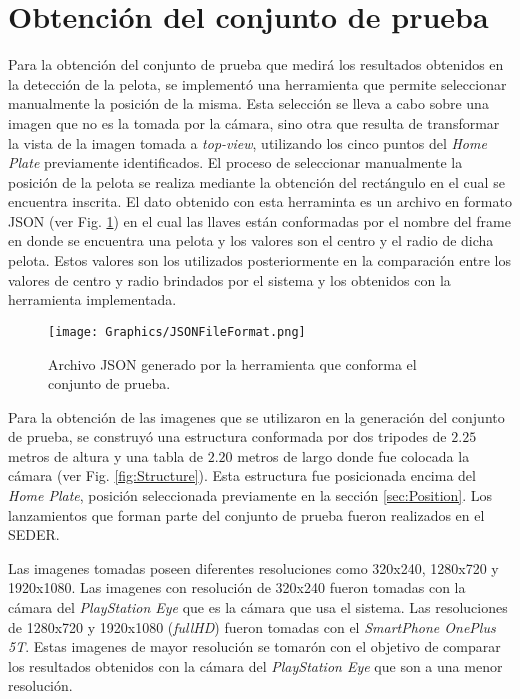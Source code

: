 \section{Obtención del conjunto de prueba}

Para la obtención del conjunto de prueba que medirá los resultados obtenidos en la detección de la pelota, se implementó una herramienta que permite seleccionar manualmente la posición de la misma. Esta selección se lleva a cabo sobre una imagen que no es la tomada por la cámara, sino otra que resulta de transformar la vista de la imagen tomada a \textit{top-view}, utilizando los cinco puntos del \textit{Home Plate} previamente identificados. El proceso de seleccionar manualmente la posición de la pelota se realiza mediante la obtención del rectángulo en el cual se encuentra inscrita. El dato obtenido con esta herraminta es un archivo en formato JSON (ver Fig. \ref{fig:JsonFile}) en el cual las llaves están conformadas por el nombre del frame en donde se encuentra una pelota y los valores son el centro y el radio de dicha pelota. Estos valores son los utilizados posteriormente en la comparación entre los valores de centro y radio brindados por el sistema y los obtenidos con la herramienta implementada.

\begin{figure}[!h]
    \centering
	\texttt{[image: Graphics/JSONFileFormat.png]}
    \caption{Archivo JSON generado por la herramienta que conforma el conjunto de prueba.}
    \label{fig:JsonFile}
\end{figure}

Para la obtención de las imagenes que se utilizaron en la generación del conjunto de prueba, se construyó una estructura conformada por dos tripodes de $2.25$ metros de altura y una tabla de $2.20$ metros de largo donde fue colocada la cámara (ver Fig. \ref{fig:Structure}). Esta estructura fue posicionada encima del \textit{Home Plate}, posición seleccionada previamente en la sección \ref{sec:Position}. Los lanzamientos que forman parte del conjunto de prueba fueron realizados en el SEDER.

Las imagenes tomadas poseen diferentes resoluciones como 320x240, 1280x720 y 1920x1080. Las imagenes con resolución de 320x240 fueron tomadas con la cámara del \textit{PlayStation Eye} que es la cámara que usa el sistema. Las resoluciones de 1280x720 y 1920x1080 (\textit{fullHD}) fueron tomadas con el \textit{SmartPhone OnePlus 5T}. Estas imagenes de mayor resolución se tomarón con el objetivo de comparar los resultados obtenidos con la cámara del \textit{PlayStation Eye} que son a una menor resolución.

